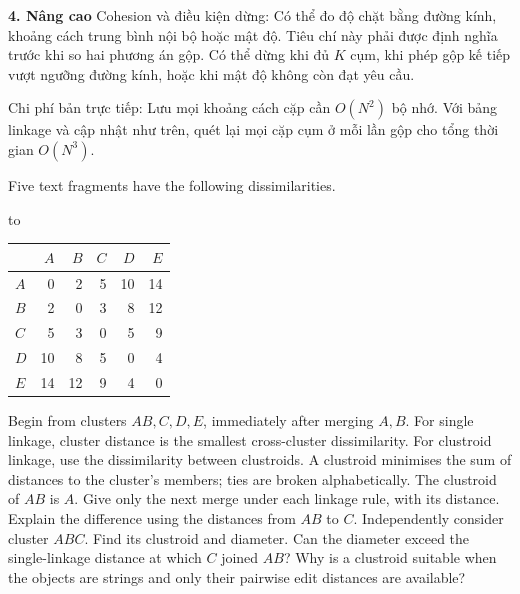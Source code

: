 \documentclass[10pt,a4paper,twocolumn]{article}
\newcommand{\key}[1]{#1:\enspace}
\newenvironment{examtable}[1]{%
  \par\addvspace{2pt}\noindent\hbox to \linewidth\bgroup\hfil
  \setlength{\tabcolsep}{4pt}%
  \renewcommand{\arraystretch}{1.12}\begin{tabular}{#1}%
}{\end{tabular}\hfil\egroup\par\addvspace{2pt}}
\newcommand{\unitheading}[2]{%
  \par\addvspace{1pt}\noindent\textbf{#1. #2}\enspace}
\newcommand{\unitadvanced}{\unitheading{4}{Nâng cao}}
\begin{document}
\unitadvanced
\key{Cohesion và điều kiện dừng} Có thể đo độ chặt bằng đường kính, khoảng cách trung bình nội bộ hoặc mật độ. Tiêu chí này phải được định nghĩa trước khi so hai phương án gộp. Có thể dừng khi đủ $K$ cụm, khi phép gộp kế tiếp vượt ngưỡng đường kính, hoặc khi mật độ không còn đạt yêu cầu.

\key{Chi phí bản trực tiếp} Lưu mọi khoảng cách cặp cần $O(N^2)$ bộ nhớ. Với bảng linkage và cập nhật như trên, quét lại mọi cặp cụm ở mỗi lần gộp cho tổng thời gian $O(N^3)$.

Five text fragments have the following dissimilarities.
\begin{examtable}{@{}lrrrrr@{}}
\toprule
& $A$ & $B$ & $C$ & $D$ & $E$\\
\midrule
$A$ & 0 & 2 & 5 & 10 & 14\\
$B$ & 2 & 0 & 3 & 8 & 12\\
$C$ & 5 & 3 & 0 & 5 & 9\\
$D$ & 10 & 8 & 5 & 0 & 4\\
$E$ & 14 & 12 & 9 & 4 & 0\\
\bottomrule
\end{examtable}
Begin from clusters $AB,C,D,E$, immediately after merging $A,B$. For single linkage, cluster distance is the smallest cross-cluster dissimilarity. For clustroid linkage, use the dissimilarity between clustroids. A clustroid minimises the sum of distances to the cluster's members; ties are broken alphabetically. The clustroid of $AB$ is $A$.
 Give only the next merge under each linkage rule, with its distance. Explain the difference using the distances from $AB$ to $C$.
 Independently consider cluster $ABC$. Find its clustroid and diameter. Can the diameter exceed the single-linkage distance at which $C$ joined $AB$?
 Why is a clustroid suitable when the objects are strings and only their pairwise edit distances are available?
\end{document}

